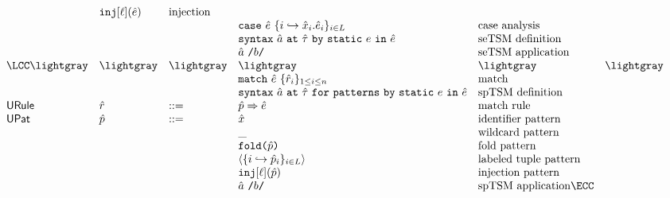 \[\begin{array}{lllllll}
& \inj{\ell}{\ue} & \text{injection}\\
&&
& \caseof{\ue}{\mapschemab{\ux}{\ue}{i}{\labelset}} & \text{case analysis}\\
&&
& \uesyntax{\tsmv}{\utau}{e}{\ue} & \text{seTSM definition}\\ 
&&
& \utsmap{\tsmv}{b} & \text{seTSM application}\\%
\LCC  \lightgray & \lightgray & \lightgray
& \lightgray 
& \lightgray & \lightgray \\
&&
& \matchwith{\ue}{\seqschemaX{\urv}} & \text{match}\\
&&
& \usyntaxup{\tsmv}{\utau}{e}{\ue}
& \text{spTSM definition}\\
\mathsf{URule} & \urv & ::= 
& \matchrule{\upv}{\ue} & \text{match rule}\\
\mathsf{UPat} & \upv & ::= 
& \ux & \text{identifier pattern}\\
&&
& \wildp & \text{wildcard pattern}\\
&&
& \foldp{\upv} & \text{fold pattern}\\
&&
& \tplp{\mapschema{\upv}{i}{\labelset}} & \text{labeled tuple pattern}\\
&&
& \injp{\ell}{\upv} & \text{injection pattern}\\
&&
& \utsmap{\tsmv}{b} & \text{spTSM application}\ECC
\end{array}\]

\clearpage

